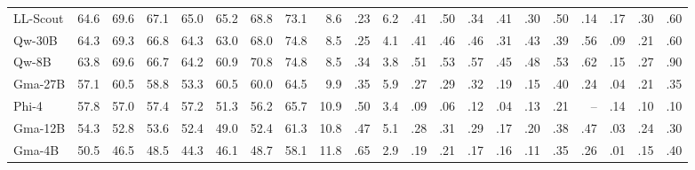 \begin{table}[H]
{\begin{tabular}{@{}l rrr rrrr rr r rrrrr rr rrr@{}}
LL-Scout     & 64.6 & 69.6 & 67.1 & 65.0 & 65.2 & 68.8 & 73.1 & 8.6 & .23 & 6.2 & .41 & .50 & .34 & .41 & .30 & .50 & .14 & .17 & .30 & .60 \\
Qw-30B       & 64.3 & 69.3 & 66.8 & 64.3 & 63.0 & 68.0 & 74.8 & 8.5 & .25 & 4.1 & .41 & .46 & .46 & .31 & .43 & .39 & .56 & .09 & .21 & .60 \\
Qw-8B        & 63.8 & 69.6 & 66.7 & 64.2 & 60.9 & 70.8 & 74.8 & 8.5 & .34 & 3.8 & .51 & .53 & .57 & .45 & .48 & .53 & .62 & .15 & .27 & .90 \\
\cmidrule(lr){1-21}
Gma-27B      & 57.1 & 60.5 & 58.8 & 53.3 & 60.5 & 60.0 & 64.5 & 9.9 & .35 & 5.9 & .27 & .29 & .32 & .19 & .15 & .40 & .24 & .04 & .21 & .35 \\
Phi-4        & 57.8 & 57.0 & 57.4 & 57.2 & 51.3 & 56.2 & 65.7 & 10.9 & .50 & 3.4 & .09 & .06 & .12 & .04 & .13 & .21 & -- & .14 & .10 & .10 \\
Gma-12B      & 54.3 & 52.8 & 53.6 & 52.4 & 49.0 & 52.4 & 61.3 & 10.8 & .47 & 5.1 & .28 & .31 & .29 & .17 & .20 & .38 & .47 & .03 & .24 & .30 \\
Gma-4B       & 50.5 & 46.5 & 48.5 & 44.3 & 46.1 & 48.7 & 58.1 & 11.8 & .65 & 2.9 & .19 & .21 & .17 & .16 & .11 & .35 & .26 & .01 & .15 & .40 \\
\bottomrule
\end{tabular}}
\end{table}

